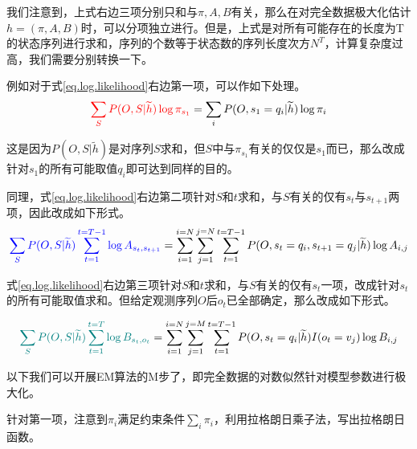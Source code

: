 \documentclass[]{article}
\begin{document}
    我们注意到，上式右边三项分别只和与$\pi,A,B$有关，那么在对完全数据极大化估计$h=(\pi, A, B)$时，可以分项独立进行。但是，上式是对所有可能存在的长度为T的状态序列进行求和，序列的个数等于状态数的序列长度次方$N^T$，计算复杂度过高，我们需要分别转换一下。
   
    例如对于式\ref{eq.log.likelihood}右边第一项，可以作如下处理。
    \begin{equation}
   	\begin{aligned}
   		\textcolor{red}{\sum_{S}P(O,S|\widetilde{h})\log{\pi_{s_{1}}}}=\sum_{i}P(O,s_{1}=q_{i}|\widetilde{h})\log{\pi_{i}}\\
   	\end{aligned}
   \end{equation}  
    
    这是因为$P(O,S|\widetilde{h})$是对序列$S$求和，但$S$中与$\pi_{s_{1}}$有关的仅仅是$s_{1}$而已，那么改成针对$s_{1}$的所有可能取值$q_{i}$即可达到同样的目的。
   
    同理，式\ref{eq.log.likelihood}右边第二项针对$S$和$t$求和，与$S$有关的仅有$s_t$与$s_{t+1}$两项，因此改成如下形式。
    \begin{equation}
   	\begin{aligned}
   		\textcolor{blue}{\sum_{S}P(O,S|\widetilde{h})\sum_{t=1}^{t=T-1}\log{A_{s_{t},s_{t+1}}}}=\sum_{i=1}^{i=N}\sum_{j=1}^{j=N}\sum_{t=1}^{t=T-1}P(O,s_t=q_i, s_{t+1}=q_j|\widetilde{h})\log{A_{i,j}}\\
   	\end{aligned}
   \end{equation}  
   
    式\ref{eq.log.likelihood}右边第三项针对$S$和$t$求和，与$S$有关的仅有$s_t$一项，改成针对$s_{t}$的所有可能取值求和。但给定观测序列$O$后$o_{t}$已全部确定，那么改成如下形式。

    \begin{equation}
	\begin{aligned}
		\textcolor{teal}{\sum_{S}P(O,S|\widetilde{h})\sum_{t=1}^{t=T}\log{B_{s_{t},o_{t}}}}=\sum_{i=1}^{i=N}\sum_{j=1}^{j=M}\sum_{t=1}^{t=T-1}P(O,s_t=q_i|\widetilde{h})I(o_t=v_j)\log{B_{i,j}}\\
	\end{aligned}
	\end{equation}    
   
    以下我们可以开展EM算法的M步了，即完全数据的对数似然针对模型参数进行极大化。
   
    针对第一项，注意到$\pi_{i}$满足约束条件$\sum_{i}\pi_{i}$，利用拉格朗日乘子法，写出拉格朗日函数。
   
\end{document}
